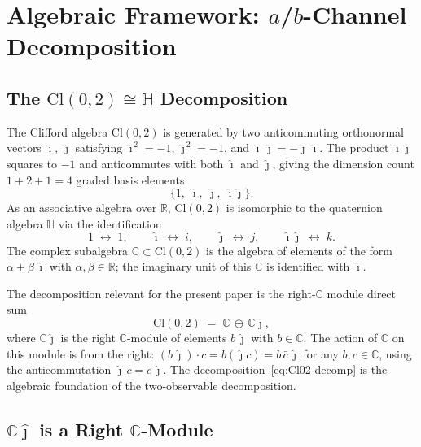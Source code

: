 \documentclass[12pt]{article}
\numberwithin{equation}{section}
\theoremstyle{plain}
\theoremstyle{definition}
\theoremstyle{remark}
\newcommand{\cl}{\mathrm{Cl}}              %
\newcommand{\R}{\mathbb{R}}                %
\newcommand{\Cplx}{\mathbb{C}}             %
\newcommand{\HH}{\mathbb{H}}               %
\newcommand{\ihat}{\hat{\imath}}           %
\newcommand{\jhat}{\hat{\jmath}}           %
\newcommand{\Cjhat}{\Cplx\jhat}            %
\begin{document}
	\section{Algebraic Framework: $a$/$b$-Channel Decomposition}
	\label{sec:framework}
	
	\subsection{The \texorpdfstring{$\cl(0,2)\cong\HH$}{Cl(0,2) = H}
		Decomposition}
	\label{sec:Cl02-decomp}
	
	The Clifford algebra $\cl(0,2)$ is generated by two anticommuting
	orthonormal vectors $\ihat,\,\jhat$ satisfying
	$\ihat^{\,2} = -1$, $\jhat^{\,2} = -1$, and
	$\ihat\,\jhat = -\jhat\,\ihat$.  The product $\ihat\jhat$ squares to
	$-1$ and anticommutes with both $\ihat$ and $\jhat$, giving the
	dimension count $1 + 2 + 1 = 4$ graded basis elements
	\[
	\{1,\;\ihat,\;\jhat,\;\ihat\jhat\}.
	\]
	As an associative algebra over $\R$, $\cl(0,2)$ is isomorphic to the
	quaternion algebra $\HH$ via the identification
	\[
	1 \;\leftrightarrow\; 1, \qquad
	\ihat \;\leftrightarrow\; i, \qquad
	\jhat \;\leftrightarrow\; j, \qquad
	\ihat\jhat \;\leftrightarrow\; k.
	\]
	The complex subalgebra $\Cplx\subset\cl(0,2)$ is the algebra of
	elements of the form $\alpha + \beta\,\ihat$ with $\alpha,\beta\in\R$;
	the imaginary unit of this $\Cplx$ is identified with $\ihat$.
	
	The decomposition relevant for the present paper is the right-$\Cplx$
	module direct sum
	\begin{equation}
		\cl(0,2) \;=\; \Cplx \,\oplus\, \Cjhat,
		\label{eq:Cl02-decomp}
	\end{equation}
	where $\Cjhat$ is the right $\Cplx$-module of elements $b\,\jhat$ with
	$b\in\Cplx$.  The action of $\Cplx$ on this module is from the right:
	$(b\,\jhat)\cdot c = b(\jhat c) = b\,\bar c\,\jhat$ for any
	$b,c\in\Cplx$, using the anticommutation $\jhat\,c = \bar c\,\jhat$.
	The decomposition~\eqref{eq:Cl02-decomp} is the algebraic foundation
	of the two-observable decomposition.
	
	\subsection{\texorpdfstring{$\Cjhat$}{Cj-hat} is a Right
		\texorpdfstring{$\Cplx$}{C}-Module}
	\label{sec:right-Cplx-module}
	
\end{document}
